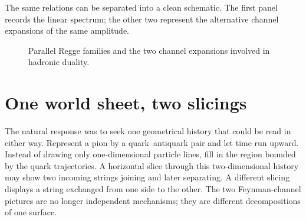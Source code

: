 The same relations can be separated into a clean schematic. The first panel
records the linear spectrum; the other two represent the alternative channel
expansions of the same amplitude.

\begin{figure}[H]
  \centering
  \caption{Parallel Regge families and the two channel expansions involved in
  hadronic duality.}
  \label{fig:l01-regge-duality-redraw}
\end{figure}

\section{One world sheet, two slicings}

The natural response was to seek one geometrical history that could be read
in either way. Represent a pion by a quark--antiquark pair and let time run
upward. Instead of drawing only one-dimensional particle lines, fill in the
region bounded by the quark trajectories. A horizontal slice through this
two-dimensional history may show two incoming strings joining and later
separating. A different slicing displays a string exchanged from one side to
the other. The two Feynman-channel pictures are no longer independent
mechanisms; they are different decompositions of one surface.

